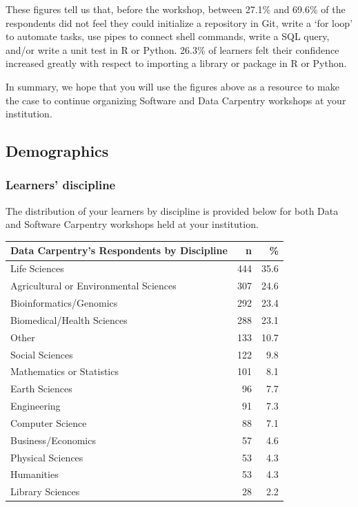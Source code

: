 \documentclass[]{article}
\begin{document}
These figures tell us that, before the workshop, between 27.1\% and
69.6\% of the respondents did not feel they could initialize a
repository in Git, write a `for loop' to automate tasks, use pipes to
connect shell commands, write a SQL query, and/or write a unit test in R
or Python. 26.3\% of learners felt their confidence increased greatly
with respect to importing a library or package in R or Python.

In summary, we hope that you will use the figures above as a resource to
make the case to continue organizing Software and Data Carpentry
workshops at your institution.

\subsection{Demographics}\label{demographics}

\subsubsection{Learners' discipline}\label{learners-discipline}

The distribution of your learners by discipline is provided below for
both Data and Software Carpentry workshops held at your institution.

\begin{longtable}[]{@{}lrr@{}}
\toprule
Data Carpentry's Respondents by Discipline & n & \%\tabularnewline
\midrule
\endhead
Life Sciences & 444 & 35.6\tabularnewline
Agricultural or Environmental Sciences & 307 & 24.6\tabularnewline
Bioinformatics/Genomics & 292 & 23.4\tabularnewline
Biomedical/Health Sciences & 288 & 23.1\tabularnewline
Other & 133 & 10.7\tabularnewline
Social Sciences & 122 & 9.8\tabularnewline
Mathematics or Statistics & 101 & 8.1\tabularnewline
Earth Sciences & 96 & 7.7\tabularnewline
Engineering & 91 & 7.3\tabularnewline
Computer Science & 88 & 7.1\tabularnewline
Business/Economics & 57 & 4.6\tabularnewline
Physical Sciences & 53 & 4.3\tabularnewline
Humanities & 53 & 4.3\tabularnewline
Library Sciences & 28 & 2.2\tabularnewline
\bottomrule
\end{longtable}
\end{document}
